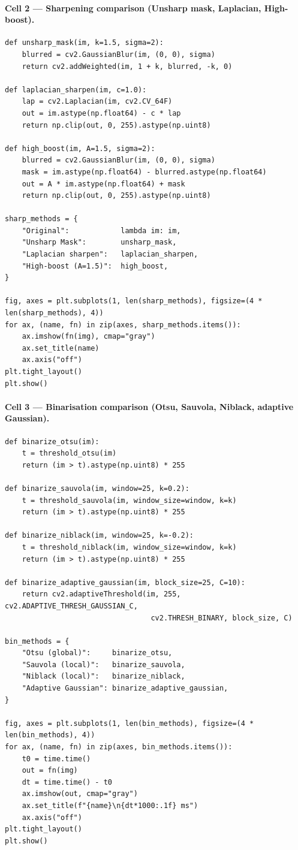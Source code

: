 \documentclass[12pt, a4paper]{article}
\begin{document}
\paragraph{Cell 2 --- Sharpening comparison (Unsharp mask, Laplacian, High-boost).}
\begin{lstlisting}
def unsharp_mask(im, k=1.5, sigma=2):
    blurred = cv2.GaussianBlur(im, (0, 0), sigma)
    return cv2.addWeighted(im, 1 + k, blurred, -k, 0)

def laplacian_sharpen(im, c=1.0):
    lap = cv2.Laplacian(im, cv2.CV_64F)
    out = im.astype(np.float64) - c * lap
    return np.clip(out, 0, 255).astype(np.uint8)

def high_boost(im, A=1.5, sigma=2):
    blurred = cv2.GaussianBlur(im, (0, 0), sigma)
    mask = im.astype(np.float64) - blurred.astype(np.float64)
    out = A * im.astype(np.float64) + mask
    return np.clip(out, 0, 255).astype(np.uint8)

sharp_methods = {
    "Original":            lambda im: im,
    "Unsharp Mask":        unsharp_mask,
    "Laplacian sharpen":   laplacian_sharpen,
    "High-boost (A=1.5)":  high_boost,
}

fig, axes = plt.subplots(1, len(sharp_methods), figsize=(4 * len(sharp_methods), 4))
for ax, (name, fn) in zip(axes, sharp_methods.items()):
    ax.imshow(fn(img), cmap="gray")
    ax.set_title(name)
    ax.axis("off")
plt.tight_layout()
plt.show()
\end{lstlisting}

\paragraph{Cell 3 --- Binarisation comparison (Otsu, Sauvola, Niblack, adaptive Gaussian).}
\begin{lstlisting}
def binarize_otsu(im):
    t = threshold_otsu(im)
    return (im > t).astype(np.uint8) * 255

def binarize_sauvola(im, window=25, k=0.2):
    t = threshold_sauvola(im, window_size=window, k=k)
    return (im > t).astype(np.uint8) * 255

def binarize_niblack(im, window=25, k=-0.2):
    t = threshold_niblack(im, window_size=window, k=k)
    return (im > t).astype(np.uint8) * 255

def binarize_adaptive_gaussian(im, block_size=25, C=10):
    return cv2.adaptiveThreshold(im, 255, cv2.ADAPTIVE_THRESH_GAUSSIAN_C,
                                  cv2.THRESH_BINARY, block_size, C)

bin_methods = {
    "Otsu (global)":     binarize_otsu,
    "Sauvola (local)":   binarize_sauvola,
    "Niblack (local)":   binarize_niblack,
    "Adaptive Gaussian": binarize_adaptive_gaussian,
}

fig, axes = plt.subplots(1, len(bin_methods), figsize=(4 * len(bin_methods), 4))
for ax, (name, fn) in zip(axes, bin_methods.items()):
    t0 = time.time()
    out = fn(img)
    dt = time.time() - t0
    ax.imshow(out, cmap="gray")
    ax.set_title(f"{name}\n{dt*1000:.1f} ms")
    ax.axis("off")
plt.tight_layout()
plt.show()
\end{lstlisting}
\end{document}
